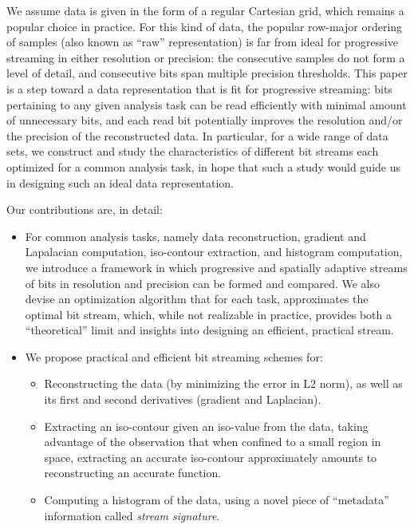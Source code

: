 We assume data is given in the form of a regular Cartesian grid, which remains a popular choice in practice. For this kind of data, the popular row-major ordering of samples (also known as ``raw'' representation) is far from ideal for progressive streaming in either resolution or precision: the consecutive samples do not form a level of detail, and consecutive bits span multiple precision thresholds. This paper is a step toward a data representation that is fit for progressive streaming: bits pertaining to any given analysis task can be read efficiently with minimal amount of unnecessary bits, and each read bit potentially improves the resolution and/or the precision of the reconstructed data. In particular, for a wide range of data sets, we construct and study the characteristics of different bit streams each optimized for a common analysis task, in hope that such a study would guide us in designing such an ideal data representation. 

Our contributions are, in detail:

\begin{itemize}
  \item For common analysis tasks, namely data reconstruction, gradient and Lapalacian computation, iso-contour extraction, and histogram computation, we introduce a framework in which progressive and spatially adaptive streams of bits in resolution and precision can be formed and compared. We also devise an optimization algorithm that for each task, approximates the optimal bit stream, which, while not realizable in practice, provides both a ``theoretical'' limit and insights into designing an efficient, practical stream.
  \item We propose practical and efficient bit streaming schemes for:
  \begin{itemize}
    \item Reconstructing the data (by minimizing the error in L2 norm), as well as its first and second derivatives (gradient and Laplacian).
    \item Extracting an iso-contour given an iso-value from the data, taking advantage of the observation that when confined to a small region in space, extracting an accurate iso-contour approximately amounts to reconstructing an accurate function.
    \item Computing a histogram of the data, using a novel piece of ``metadata'' information called \emph{stream signature}.
  \end{itemize}
\end{itemize}
